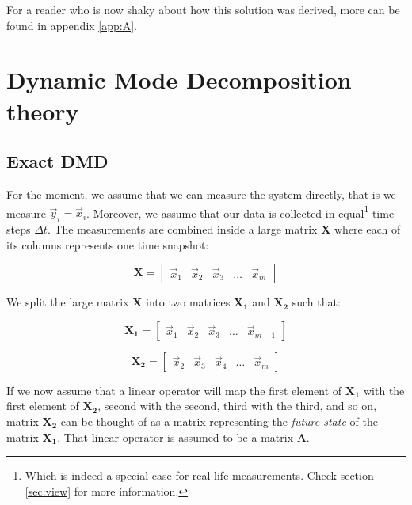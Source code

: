 \documentclass[10pt,twocolumn]{article}
\begin{document}
For a reader who is now shaky about how this solution was derived, more can be found in appendix \ref{app:A}. 

\section{Dynamic Mode Decomposition theory}

\subsection{Exact DMD}

For the moment, we assume that we can measure the system directly, that is we measure $\vec{y}_i = \vec{x}_i$. Moreover, we assume that our data is collected in equal\footnote{Which is indeed a special case for real life measurements. Check section \ref{sec:view} for more information.} time steps $\Delta t$. The measurements are combined inside a large matrix $\bm{X}$ where each of its columns represents one time snapshot:

\begin{equation} \label{eq:X}
\bm{X} = 
\begin{bmatrix}
    \vec{x}_1 & \vec{x}_2 & \vec{x}_3 & \dots & \vec{x}_{m}
\end{bmatrix}
\end{equation}

We split the large matrix $\bm{X}$ into two matrices $\bm{X_1}$ and $\bm{X_2}$ such that:

\begin{equation} \label{eq:X1}
\bm{X_1} = 
\begin{bmatrix}
    \vec{x}_1 & \vec{x}_2 & \vec{x}_3 & \dots & \vec{x}_{m-1}
\end{bmatrix}
\end{equation}

\begin{equation} \label{eq:X2}
\bm{X_2} = 
\begin{bmatrix}
    \vec{x}_2 & \vec{x}_3 & \vec{x}_4 & \dots & \vec{x}_{m}
\end{bmatrix}
\end{equation}

If we now assume that a linear operator will map the first element of $\bm{X_1}$ with the first element of $\bm{X_2}$, second with the second, third with the third, and so on, matrix $\bm{X_2}$ can be thought of as a matrix representing the \textit{future state} of the matrix $\bm{X_1}$. That linear operator is assumed to be a matrix $\bm{A}$. 
\end{document}
